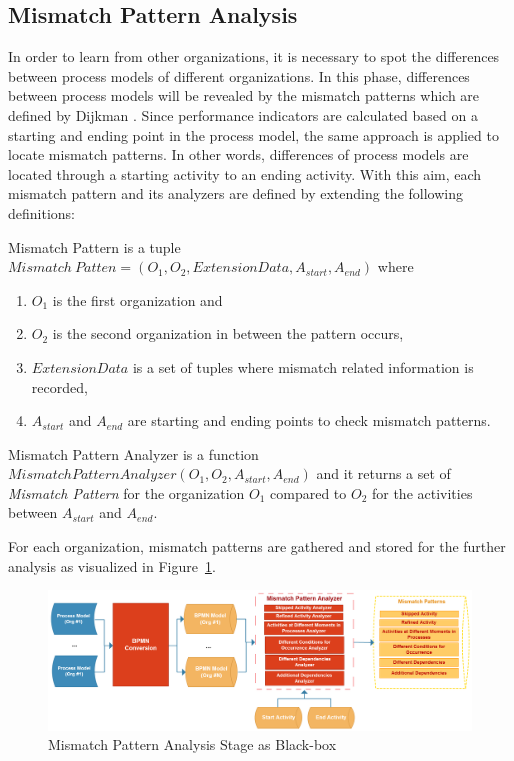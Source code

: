 \subsection{Mismatch Pattern Analysis}
\label{subsec:mismatch-pattern-analysis}
In order to learn from other organizations, it is necessary to spot the differences between process models of different organizations. In this phase, differences between process models will be revealed by the mismatch patterns which are defined by Dijkman \cite{dijkman2007mismatch}. Since performance indicators are calculated based on a starting and ending point in the process model, the same approach is applied to locate mismatch patterns. In other words, differences of process models are located through a starting activity to an ending activity. With this aim, each mismatch pattern and its analyzers are defined by extending the following definitions:
\theoremstyle{definition}
    \begin{definition}
    Mismatch Pattern is a tuple ${Mismatch\ Patten} = (O_{1}, O_{2}, ExtensionData, A_{start}, A_{end}) $ where 
    \begin{enumerate}
      \item $O_{1}$ is the first organization and \item $O_{2}$ is the second organization in between the pattern occurs,
      \item $ExtensionData$ is a set of tuples where mismatch related information is recorded, 
      \item $A_{start}$ and $A_{end}$ are starting and ending points to check mismatch patterns.
    \end{enumerate}
    \end{definition}
\theoremstyle{definition}

\begin{definition}
    Mismatch Pattern Analyzer is a function $MismatchPatternAnalyzer(O_{1}, O_{2}, A_{start}, A_{end})$ and it returns a set of \textit{Mismatch Pattern} for the organization $O_{1}$ compared to $O_{2}$ for the activities between $A_{start}$ and $A_{end}$.
\end{definition}

For each organization, mismatch patterns are gathered and stored for the further analysis as visualized in Figure~\ref{fig:mismatch-pattern-analysis-blackbox}.
\begin{figure}
  \centering
  \includegraphics[width=\textwidth]{4_methodology/mismatch-pattern-analysis-blackbox}
  \caption{Mismatch Pattern Analysis Stage as Black-box}
  \label{fig:mismatch-pattern-analysis-blackbox}
\end{figure}

